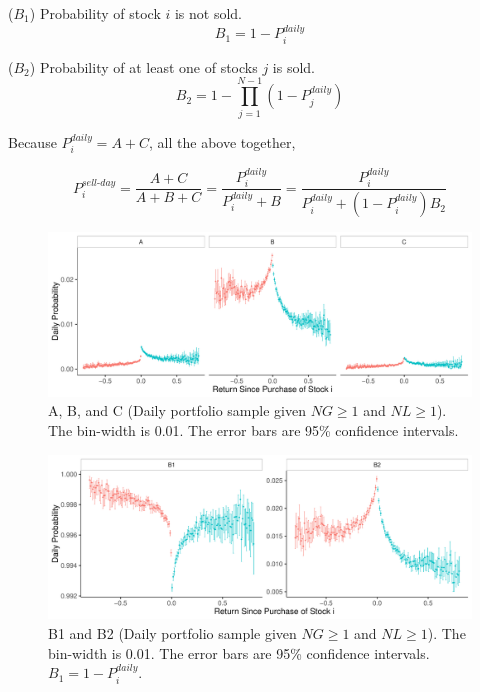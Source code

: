 \documentclass[11pt, a4paper]{article}
\newcommand{\HS}[1]{\textcolor{blue}{HS: #1}}
\begin{document}
\begin{appendices}
\noindent
($B_{1}$) Probability of stock $i$ is not sold.
\begin{equation}
\label{eq:B1}
B_1 = 1-P^{daily}_{i}
\end{equation}

\noindent
($B_{2}$) Probability of at least one of stocks $j$ is sold.
\begin{equation}
\label{eq:B2}
B_2 = 1-\prod_{j=1}^{N-1}(1-P^{daily}_{j})
\end{equation}

\noindent

Because $P^{daily}_{i} = A+C$, all the above together,

\begin{equation}
\label{eq:PABC}
P^{sell\mbox{-}day}_{i} = \frac{A+C}{A+B+C} = \frac{P^{daily}_{i}}{P^{daily}_{i}+B} = \frac{P^{daily}_{i}}{P^{daily}_{i}+(1-P^{daily}_{i})B_2}
\end{equation}



\begin{figure}[H]
	\centering
	\includegraphics[width=1\columnwidth]{barc_ABC_NG1_NL1_3.pdf}
	\caption{\small A, B, and C (Daily portfolio sample given $NG\geq1$ and $NL\geq1$). The bin-width is 0.01. The error bars are 95\% confidence intervals.}
	\label{figure:prop_ABC_NG1NL1}
\end{figure}

\begin{figure}[H]
	\centering
	\includegraphics[width=1\columnwidth]{barc_B12_NG1_NL1_3.pdf}
	\caption{\small B1 and B2 (Daily portfolio sample given $NG\geq1$ and $NL\geq1$). The bin-width is 0.01. The error bars are 95\% confidence intervals. $B_{1}=1-P^{daily}_{i}$.}
	\label{figure:prop_B12_NG1NL1}
\end{figure}

\end{appendices}

\pagebreak


\end{document}
